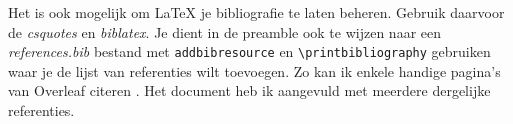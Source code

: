 \documentclass{article}
\begin{document}
Het is ook mogelijk om LaTeX je bibliografie te laten beheren.
Gebruik daarvoor de \textit{csquotes} en \textit{biblatex}.
Je dient in de preamble ook te wijzen naar een \textit{references.bib} bestand met \verb|addbibresource| en \verb|\printbibliography| gebruiken waar je de lijst van referenties wilt toevoegen.
Zo kan ik enkele handige pagina's van Overleaf citeren \cite{Overleaf30min}.
Het document heb ik aangevuld met meerdere dergelijke referenties.

\printbibliography
\end{document}
